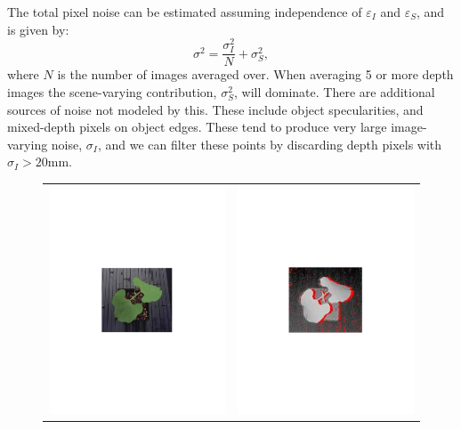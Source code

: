 The total pixel noise can be estimated assuming independence of $\varepsilon_I$ and $\varepsilon_S$, and is given by:
\begin{equation}
\sigma^2 = \frac{\sigma_I^2}{N} + \sigma_S^2,\label{eq:sigma}
\end{equation}
where $N$ is the number of images averaged over.  When averaging 5 or more depth images the scene-varying contribution, $\sigma_S^2$, will dominate.  There are additional sources of noise not modeled by this.  These include object specularities, and mixed-depth pixels on object edges.  These tend to produce very large image-varying noise, $\sigma_I$, and we can filter these points by discarding depth pixels with $\sigma_I>20$mm.  


\begin{figure}
\begin{center}
\begin{tabular}{cc}
\includegraphics[trim=190 280 190 290,clip,width=0.47\linewidth]{Figures/beanColor} &
\includegraphics[trim=190 280 190 290,clip,width=0.47\linewidth]{Figures/beanDepth} \\

\end{tabular}
\end{center}
\end{figure}
